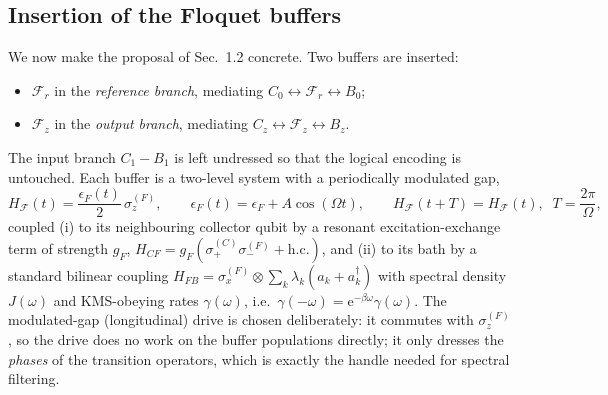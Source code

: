 \documentclass[11pt,a4paper]{article}
\theoremstyle{definition}
\theoremstyle{remark}
\newcommand{\ee}{\mathrm{e}}
\begin{document}
\subsection{Insertion of the Floquet buffers}
\label{sec:floquet-insertion}
We now make the proposal of Sec.~1.2 concrete. Two buffers are
inserted:
\begin{itemize}
\item $\mathcal{F}_r$ in the \emph{reference branch}, mediating
$C_0 \leftrightarrow \mathcal{F}_r \leftrightarrow B_0$;
\item $\mathcal{F}_z$ in the \emph{output branch}, mediating
$C_z \leftrightarrow \mathcal{F}_z \leftrightarrow B_z$.
\end{itemize}
The input branch $C_1\!-\!B_1$ is left undressed so that the logical
encoding is untouched. Each buffer is a two-level system with a
periodically modulated gap,
\begin{equation}
H_{\mathcal{F}}(t)
= \frac{\epsilon_F(t)}{2}\,\sigma_z^{(F)},
\qquad
\epsilon_F(t) = \epsilon_F + A\cos(\Omega t),
\qquad
H_\mathcal{F}(t+T)=H_\mathcal{F}(t),\;\; T = \frac{2\pi}{\Omega},
\label{eq:bufferH}
\end{equation}
coupled (i) to its neighbouring collector qubit by a resonant
excitation-exchange term of strength $g_F$,
$H_{CF} = g_F(\sigma_+^{(C)}\sigma_-^{(F)} + \mathrm{h.c.})$, and
(ii) to its bath by a standard bilinear coupling
$H_{FB} = \sigma_x^{(F)}\otimes \sum_k \lambda_k (a_k + a_k^\dagger)$
with spectral density $J(\omega)$ and KMS-obeying rates
$\gamma(\omega)$, i.e.\ $\gamma(-\omega)=\ee^{-\beta\omega}\gamma(\omega)$.
The modulated-gap (longitudinal) drive is chosen deliberately: it
commutes with $\sigma_z^{(F)}$, so the drive does no work on the buffer
populations directly; it only dresses the \emph{phases} of the
transition operators, which is exactly the handle needed for spectral
filtering.
 
\end{document}
